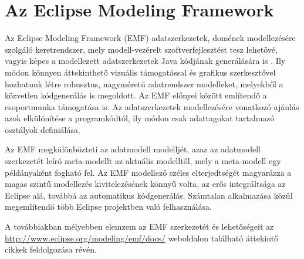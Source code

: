 \section{Az Eclipse Modeling Framework}

Az Eclipse Modeling Framework (\gls{EMF}) adatszerkezetek, domének modellezésére szolgáló keretrendszer, mely modell-vezérelt szoftverfejlesztést tesz lehetővé, vagyis képes a modellezett adatszerkezetek Java kódjának generálására is \cite{VogelEMF}.
Ily módon könnyen áttekinthető vizuális támogatással és grafikus szerkesztővel hozhatunk létre robusztus, nagyméretű adatrendszer modelleket, melyekből a közvetlen kódgenerálás is megoldott.
Az \gls{EMF} előnyei között említendő a csoportmunka támogatása is.
Az adatszerkezetek modellezésére vonatkozó ajánlás azok elkülönítése a programkódtól, ily módon csak adattagokat tartalmazó osztályok definiálása.

Az \gls{EMF} megkülönbözteti az adatmodell modelljét, azaz az adatmodell szerkezetét leíró meta-modellt az aktuális modelltől, mely a meta-modell egy példányaként fogható fel. 
Az \gls{EMF} modellező széles elterjedtségét magyarázza a magas szintű modellezés kivitelezésének könnyű volta, az erős integráltsága az Eclipse alá, továbbá az automatikus kódgenerálás.
Számtalan alkalmazása közül megemlítendő több Eclipse projektben való felhasználása.

A továbbiakban mélyebben elemzem az EMF szerkezetét és lehetőségeit az \url{http://www.eclipse.org/modeling/emf/docs/} weboldalon található áttekintő cikkek \cite{Steinberg:2009:EEM:1197540,VogelEMF} feldolgozása révén.

